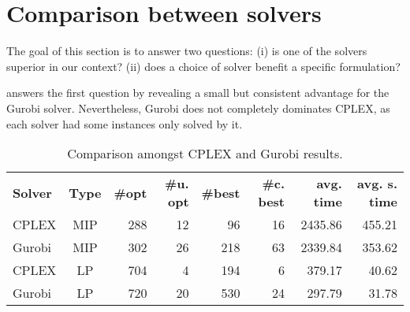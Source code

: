 \section{Comparison between solvers}
\label{sec:results_comparing_solvers}

The goal of this section is to answer two questions:
(i) is one of the solvers superior in our context?
(ii) does a choice of solver benefit a specific formulation?

 answers the first question by revealing a small but consistent advantage for the Gurobi solver.
Nevertheless, Gurobi does not completely dominates CPLEX, as each solver had some instances only solved by it.

\begin{table}[h]
  \center
  \caption{Comparison amongst CPLEX and Gurobi results.}
  \setlength{}
  \begin{tabular}{lcrrrrrr}
    \hline\hline
    \textbf{Solver} & \textbf{Type} & \textbf{\#opt} & \textbf{\#u. opt} & \textbf{\#best} & \textbf{\#c. best} & \textbf{avg. time} & \textbf{avg. s. time} \\\cmidrule(lr){1-2}\cmidrule(lr){3-8}
     CPLEX & MIP & 288 & 12 &  96 & 16 & 2435.86 & 455.21 \\
    Gurobi & MIP & 302 & 26 & 218 & 63 & 2339.84 & 353.62 \\
     CPLEX & LP  & 704 &  4 & 194 &  6 &  379.17 &  40.62 \\
    Gurobi & LP  & 720 & 20 & 530 & 24 &  297.79 &  31.78 \\\hline\hline
  \end{tabular}
  \label{tab:cplex_vs_gurobi}
\end{table}

